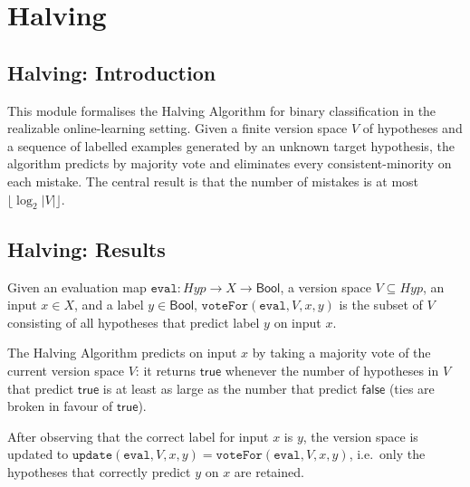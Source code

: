 \section{Halving}
\subsection*{Halving: Introduction}

This module formalises the Halving Algorithm for binary classification in the
realizable online-learning setting.  Given a finite version space $V$ of hypotheses
and a sequence of labelled examples generated by an unknown target hypothesis, the
algorithm predicts by majority vote and eliminates every consistent-minority on each
mistake.  The central result is that the number of mistakes is at most
$\lfloor\log_2 |V|\rfloor$.

\subsection*{Halving: Results}

\begin{definition}
\label{Halving.voteFor}
\leanok
Given an evaluation map $\mathtt{eval} : \mathit{Hyp} \to X \to \mathsf{Bool}$, a
version space $V \subseteq \mathit{Hyp}$, an input $x \in X$, and a label
$y \in \mathsf{Bool}$, $\mathtt{voteFor}(\mathtt{eval}, V, x, y)$ is the subset of $V$
consisting of all hypotheses that predict label $y$ on input $x$.
\end{definition}

\begin{definition}
\label{Halving.predict}
\leanok
{}
The Halving Algorithm predicts on input $x$ by taking a majority vote of the current
version space $V$: it returns $\mathsf{true}$ whenever the number of hypotheses in $V$
that predict $\mathsf{true}$ is at least as large as the number that predict
$\mathsf{false}$ (ties are broken in favour of $\mathsf{true}$).
\end{definition}

\begin{definition}
\label{Halving.update}
\leanok
{}
After observing that the correct label for input $x$ is $y$, the version space is
updated to $\mathtt{update}(\mathtt{eval}, V, x, y) = \mathtt{voteFor}(\mathtt{eval},
V, x, y)$, i.e.\ only the hypotheses that correctly predict $y$ on $x$ are retained.
\end{definition}

